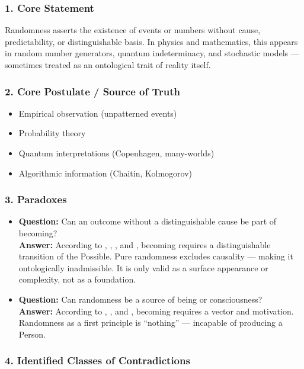 \documentclass[12pt]{article}
\begin{document}
\subsubsection*{1. Core Statement}

Randomness asserts the existence of events or numbers without cause, predictability, or distinguishable basis. In physics and mathematics, this appears in random number generators, quantum indeterminacy, and stochastic models — sometimes treated as an ontological trait of reality itself.

\subsubsection*{2. Core Postulate / Source of Truth}

\begin{itemize}
\item Empirical observation (unpatterned events)
\item Probability theory
\item Quantum interpretations (Copenhagen, many-worlds)
\item Algorithmic information (Chaitin, Kolmogorov)
\end{itemize}

\subsubsection*{3. Paradoxes}

\begin{itemize}
\item \textbf{Question:} Can an outcome without a distinguishable cause be part of becoming?  
\\ \textbf{Answer:} According to \text{[6]}, \text{[4.3]}, \text{[9]}, and \text{[11.1.1]}, becoming requires a distinguishable transition of the Possible. Pure randomness excludes causality — making it ontologically inadmissible. It is only valid as a surface appearance or complexity, not as a foundation.

\item \textbf{Question:} Can randomness be a source of being or consciousness?  
\\ \textbf{Answer:} According to \text{[1]}, \text{[12.3]}, and \text{[10.6]}, becoming requires a vector and motivation. Randomness as a first principle is ``nothing'' — incapable of producing a Person.
\end{itemize}

\subsubsection*{4. Identified Classes of Contradictions}
\end{document}
